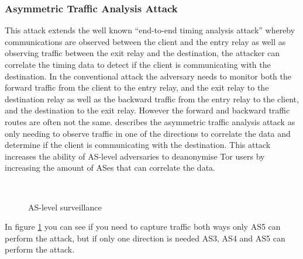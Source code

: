 \documentclass[9pt,technote]{IEEEtran}
\begin{document}
\subsubsection{Asymmetric Traffic Analysis Attack}
This attack extends the well known ``end-to-end timing analysis attack'' whereby
communications are observed between the client and the entry relay as well as
observing traffic between the exit relay and the destination, the attacker can
correlate the timing data to detect if the client is communicating with the
destination. In the conventional attack the adversary needs to monitor both the
forward traffic from the client to the entry relay, and the exit relay to the
destination relay as well as the backward traffic from the entry relay to the
client, and the destination to the exit relay. However the forward and backward
traffic routes are often not the same. \citeauthor{sun2015raptor} describes the
asymmetric traffic analysis attack as only needing to observe traffic in one of
the directions to correlate the data and determine if the client is
communicating with the destination. This attack increases the ability of
AS-level adversaries to deanonymise Tor users by increasing the amount of ASes
that can correlate the data.
\begin{figure}[h!]
\centering
{}
~~
\label{fig:as-routing}
\caption{AS-level surveillance \cite{sun2015raptor}}
\end{figure}
In figure \ref{fig:as-routing} you can see if you need to capture traffic both
ways only AS5 can perform the attack, but if only one direction is needed AS3,
AS4 and AS5 can perform the attack.
\end{document}
